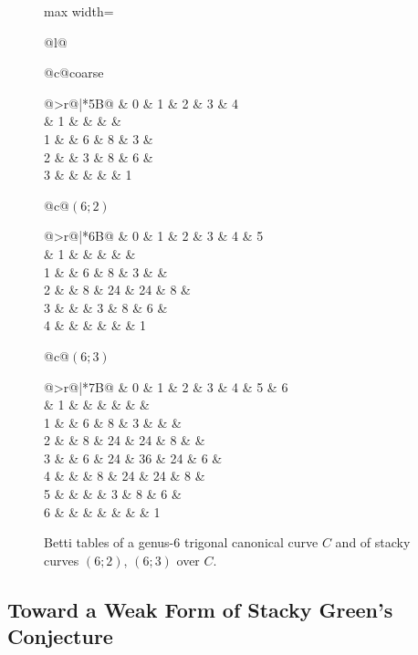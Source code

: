 \documentclass[11pt,reqno]{amsart}
\makeatletter
\theoremstyle{remark}
\newcommand{\z}{\textendash}               %
\newcommand{\h}[1]{{\scriptsize #1}}       %
\newenvironment{betti}[1]
  {\begingroup\setlength{\tabcolsep}{1.5pt}%
      \renewcommand{\arraystretch}{.95}%
   \begin{tabular}[t]{@{}>{\scriptsize}r@{\hspace{5pt}}|*{#1}{B}@{}}}
  {\end{tabular}\endgroup}
\newcommand{\bettipanel}[2]{%
  \begin{tabular}[t]{@{}c@{}}\small #1\\[3pt] #2\end{tabular}}
\makeatother
\begin{document}
\begin{figure}
\centering
\begin{adjustbox}{max width=\linewidth}
\begin{tabular}{@{}l@{}}

\bettipanel{coarse}{%
\begin{betti}{5}
  & \h0 & \h1 & \h2 & \h3 & \h4 \\ \hline
0 & 1  & \z & \z & \z & \z \\
1 & \z & 6  & 8  & 3  & \z \\
2 & \z & 3  & 8  & 6  & \z \\
3 & \z & \z & \z & \z & 1
\end{betti}}%
\hspace{2.2em}%
\bettipanel{$(6;2)$}{%
\begin{betti}{6}
  & \h0 & \h1 & \h2 & \h3 & \h4 & \h5 \\ \hline
0 & 1  & \z & \z & \z & \z & \z \\
1 & \z & 6  & 8  & 3  & \z & \z \\
2 & \z & 8  & 24 & 24 & 8  & \z \\
3 & \z & \z & 3  & 8  & 6  & \z \\
4 & \z & \z & \z & \z & \z & 1
\end{betti}}%
\hspace{2.2em}%
\bettipanel{$(6;3)$}{%
\begin{betti}{7}
  & \h0 & \h1 & \h2 & \h3 & \h4 & \h5 & \h6 \\ \hline
0 & 1  & \z & \z & \z & \z & \z & \z \\
1 & \z & 6  & 8  & 3  & \z & \z & \z \\
2 & \z & 8  & 24 & 24 & 8  & \z & \z \\
3 & \z & 6  & 24 & 36 & 24 & 6  & \z \\
4 & \z & \z & 8  & 24 & 24 & 8  & \z \\
5 & \z & \z & \z & 3  & 8  & 6  & \z \\
6 & \z & \z & \z & \z & \z & \z & 1
\end{betti}}

\end{tabular}
\end{adjustbox}
\caption{Betti tables of a genus-$6$ trigonal canonical curve $C$ and of stacky curves $(6;2)$, $(6;3)$ over $C$.}\label{fig:betti}
\end{figure}

\subsection{Toward a Weak Form of Stacky Green's Conjecture}\label{subsec:stacky-green}
\end{document}
